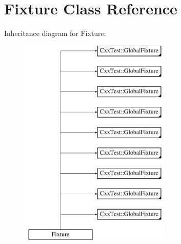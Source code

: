 \hypertarget{classFixture}{\section{Fixture Class Reference}
\label{classFixture}
}
Inheritance diagram for Fixture\-:\begin{figure}[H]
\begin{center}
\leavevmode
\includegraphics[height=10.000000cm]{classFixture}
\end{center}
\end{figure}
